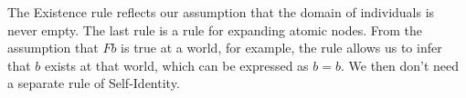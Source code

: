 
\bigskip

The Existence rule reflects our assumption that the domain of individuals is
never empty. The last rule is a rule for expanding atomic nodes. From the
assumption that $Fb$ is true at a world, for example, the rule allows us to
infer that $b$ exists at that world, which can be expressed as $b\!=\!b$. We
then don't need a separate rule of Self-Identity.

%
%

